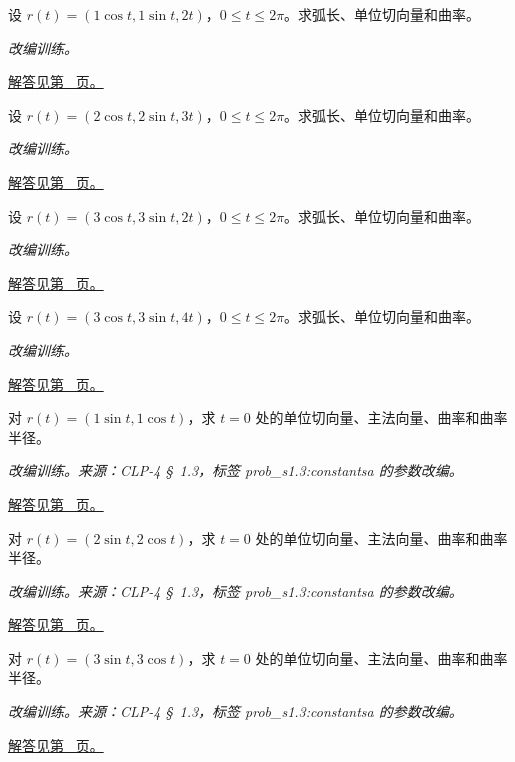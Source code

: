 \documentclass[UTF8,12pt,a4paper,fontset=fandol]{ctexart}
\begin{document}
\begin{example}[圆柱螺线的弧长与曲率]\label{ex:c31q15}
设 $r(t)=(1\cos t,1\sin t,2t)$，$0\le t\le2\pi$。求弧长、单位切向量和曲率。
\par\textit{改编训练。}\par\hyperref[ans:c31q15]{解答见第~\pageref{ans:c31q15} 页。}
\end{example}
\begin{example}[圆柱螺线的弧长与曲率]\label{ex:c31q16}
设 $r(t)=(2\cos t,2\sin t,3t)$，$0\le t\le2\pi$。求弧长、单位切向量和曲率。
\par\textit{改编训练。}\par\hyperref[ans:c31q16]{解答见第~\pageref{ans:c31q16} 页。}
\end{example}
\begin{example}[圆柱螺线的弧长与曲率]\label{ex:c31q17}
设 $r(t)=(3\cos t,3\sin t,2t)$，$0\le t\le2\pi$。求弧长、单位切向量和曲率。
\par\textit{改编训练。}\par\hyperref[ans:c31q17]{解答见第~\pageref{ans:c31q17} 页。}
\end{example}
\begin{example}[圆柱螺线的弧长与曲率]\label{ex:c31q18}
设 $r(t)=(3\cos t,3\sin t,4t)$，$0\le t\le2\pi$。求弧长、单位切向量和曲率。
\par\textit{改编训练。}\par\hyperref[ans:c31q18]{解答见第~\pageref{ans:c31q18} 页。}
\end{example}
\begin{example}[圆的定向切向与曲率]\label{ex:c31q19}
对 $r(t)=(1\sin t,1\cos t)$，求 $t=0$ 处的单位切向量、主法向量、曲率和曲率半径。
\par\textit{改编训练。来源：CLP-4 \S~1.3，标签 prob\_s1.3:constantsa 的参数改编。}\par\hyperref[ans:c31q19]{解答见第~\pageref{ans:c31q19} 页。}
\end{example}
\begin{example}[圆的定向切向与曲率]\label{ex:c31q20}
对 $r(t)=(2\sin t,2\cos t)$，求 $t=0$ 处的单位切向量、主法向量、曲率和曲率半径。
\par\textit{改编训练。来源：CLP-4 \S~1.3，标签 prob\_s1.3:constantsa 的参数改编。}\par\hyperref[ans:c31q20]{解答见第~\pageref{ans:c31q20} 页。}
\end{example}
\begin{example}[圆的定向切向与曲率]\label{ex:c31q21}
对 $r(t)=(3\sin t,3\cos t)$，求 $t=0$ 处的单位切向量、主法向量、曲率和曲率半径。
\par\textit{改编训练。来源：CLP-4 \S~1.3，标签 prob\_s1.3:constantsa 的参数改编。}\par\hyperref[ans:c31q21]{解答见第~\pageref{ans:c31q21} 页。}
\end{example}
\end{document}
